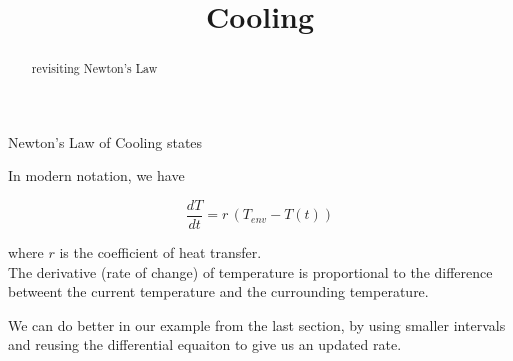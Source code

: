 \documentclass{ximera}
\title{Cooling}
\begin{document}
\begin{abstract}
  revisiting Newton's Law
\end{abstract}
\maketitle




Newton's Law of Cooling states





In modern notation, we have

\[
\frac{dT}{dt} = r \, (T_{env} - T(t))
\]

where $r$ is the coefficient of heat transfer.\\





The derivative (rate of change) of temperature is proportional to the difference betweent the current temperature and the currounding temperature.





We can do better in our example from the last section, by using smaller intervals and reusing the differential equaiton to give us an updated rate.
\end{document}
